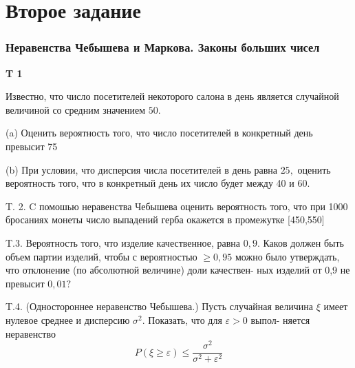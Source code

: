 \documentclass[a4paper,12pt]{article} %
\begin{document}
\clearpage
\part{Второе задание}


\section{Неравенства Чебышева и Маркова. Законы больших чисел}


\begin{example}\textbf{T 1}
	
Известно, что число посетителей некоторого салона в день является случайной величиной со средним значением $50 .$

(a) Оценить вероятность того, что число посетителей в конкретный день превысит 75

(b) При условии, что дисперсия числа посетителей в день равна $25,$ 
оценить вероятность того, что в конкретный день их число будет между 40 и $60 .$




\end{example}



\begin{example}

T. 2. $\mathrm{C}$ помошью неравенства Чебышева оценить вероятность того, что при 1000 бросаниях монеты число выпадений герба окажется в промежутке [450,550]




\end{example}



\begin{example}

T.3. 
Вероятность того, что изделие качественное, равна $0,9 .$ 
Каков должен быть объем партии изделий, чтобы с вероятностью $\geq 0,95$ можно было утверждать, что отклонение (по абсолютной величине) доли качествен-
ных изделий от 0,9 не превысит $0,01 ?$




\end{example}





\begin{example}


T.4. (Одностороннее неравенство Чебышева.) Пусть случайная величина $\xi$ имеет нулевое среднее и дисперсию $\sigma^{2} .$ Показать, что для $\varepsilon>0$ выпол-
няется неравенство
$$
P(\xi \geq \varepsilon) \leq \frac{\sigma^{2}}{\sigma^{2}+\varepsilon^{2}}
$$



\end{example}
\end{document}
